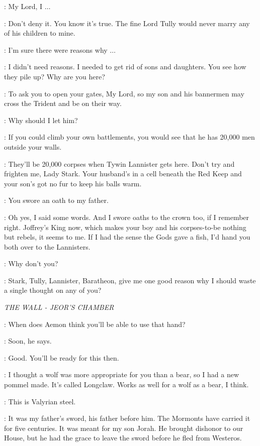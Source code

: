 \CATELYN: My Lord, I $\ldots$  

\FREY: Don't deny it. You know it's true. The fine Lord Tully would never marry any of his children to mine. 

\CATELYN: I'm sure there were reasons why $\ldots$  

\FREY: I didn't need reasons. I needed to get rid of sons and daughters. You see how they pile up? Why are you here? 

\CATELYN: To ask you to open your gates, My Lord, so my son and his bannermen may cross the Trident and be on their way. 

\FREY: Why should I let him? 

\CATELYN: If you could climb your own battlements, you would see that he has 20,000 men outside your walls. 

\FREY: They'll be 20,000 corpses when Tywin Lannister gets here. Don't try and frighten me, Lady Stark. Your husband's in a cell beneath the Red Keep and your son's got no fur to keep his balls warm. 

\CATELYN: You swore an oath to my father. 

\FREY: Oh yes, I said some words. And I swore oaths to the crown too, if I remember right. Joffrey's King now, which makes your boy and his corpses-to-be nothing but rebels, it seems to me. If I had the sense the Gods gave a fish, I'd hand you both over to the Lannisters. 

\CATELYN: Why don't you? 

\FREY: Stark, Tully, Lannister, Baratheon, give me one good reason why I should waste a single thought on any of you? 


\scene

\textit{THE WALL - JEOR'S CHAMBER} 


\JEOR: When does Aemon think you'll be able to use that hand? 

\JON: Soon, he says. 

\JEOR: Good. You'll be ready for this then. 


\JEOR: I thought a wolf was more appropriate for you than a bear, so I had a new pommel made. It's called Longclaw. Works as well for a wolf as a bear, I think. 

\JON: This is Valyrian steel. 

\JEOR: It was my father's sword, his father before him. The Mormonts have carried it for five centuries. It was meant for my son Jorah. He brought dishonor to our House, but he had the grace to leave the sword before he fled from Westeros. 

